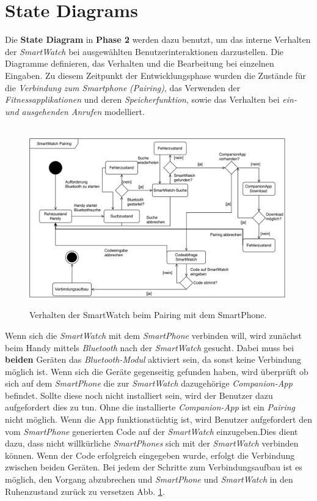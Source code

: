 \section{State Diagrams}
Die \textbf{State Diagram} in \textbf{Phase 2} werden dazu benutzt, um das interne Verhalten der \textit{SmartWatch} bei ausgewählten Benutzerinteraktionen darzustellen. Die Diagramme definieren, das Verhalten und die Bearbeitung bei einzelnen Eingaben. Zu diesem Zeitpunkt der Entwicklungsphase wurden die Zustände für die \textit{Verbindung zum Smartphone} \textit{(Pairing)}, das Verwenden der \textit{Fitnessapplikationen} und deren \textit{Speicherfunktion}, sowie das Verhalten bei \textit{ein- und ausgehenden Anrufen} modelliert.\\
\begin{figure}[h]
\centering\
\includegraphics[width=\textwidth]{img/statePairing}
\caption[State Diagram: Pairing]{Verhalten der SmartWatch beim Pairing mit dem SmartPhone.}
\label{fig:statePairing}
\end{figure}
Wenn sich die \textit{SmartWatch} mit dem \textit{SmartPhone} verbinden will, wird zunächst beim Handy mittels \textit{Bluetooth} nach der \textit{SmartWatch} gesucht. Dabei muss bei \textbf{beiden} Geräten das \textit{Bluetooth-Modul} aktiviert sein, da sonst keine Verbindung möglich ist. Wenn sich die Geräte gegenseitig gefunden haben, wird überprüft ob sich auf dem \textit{SmartPhone} die zur \textit{SmartWatch} dazugehörige \textit{Companion-App} befindet. Sollte diese noch nicht installiert sein, wird der Benutzer dazu aufgefordert dies zu tun. Ohne die installierte \textit{Companion-App} ist ein \textit{Pairing} nicht möglich. Wenn die App funktionstüchtig ist, wird Benutzer aufgefordert den vom \textit{SmartPhone} generierten Code auf der \textit{SmartWatch} einzugeben.Dies dient dazu, dass nicht willkürliche \textit{SmartPhones} sich mit der \textit{SmartWatch} verbinden können. Wenn der Code erfolgreich eingegeben wurde, erfolgt die Verbindung zwischen beiden Geräten. Bei jedem der Schritte zum Verbindungsaufbau ist es möglich, den Vorgang abzubrechen und \textit{SmartPhone} und \textit{SmartWatch} in den Ruhenzustand zurück zu versetzen Abb. \ref{fig:statePairing}.\\
